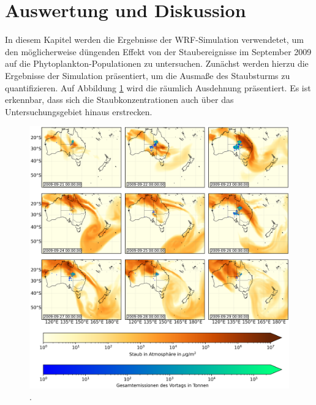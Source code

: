 \documentclass[12pt,a4paper,onecolumn]{scrartcl}
\begin{document}
\section{Auswertung und Diskussion}
In diesem Kapitel werden die Ergebnisse der WRF-Simulation verwendetet, um den möglicherweise düngenden Effekt von der Staubereignisse im September 2009 auf die Phytoplankton-Populationen zu untersuchen. Zunächst werden hierzu die Ergebnisse der Simulation präsentiert, um die Ausmaße des Staubsturms zu quantifizieren. Auf Abbildung \ref{fig:dustload} wird die räumlich Ausdehnung präsentiert. Es ist erkennbar, dass sich die Staubkonzentrationen auch über das Untersuchungsgebiet hinaus erstrecken. 
\begin{figure}[ht]
\includegraphics[width=\textwidth]{bilder/dustload.png}
\caption{.} \label{fig:dustload}
\end{figure}
\end{document}
